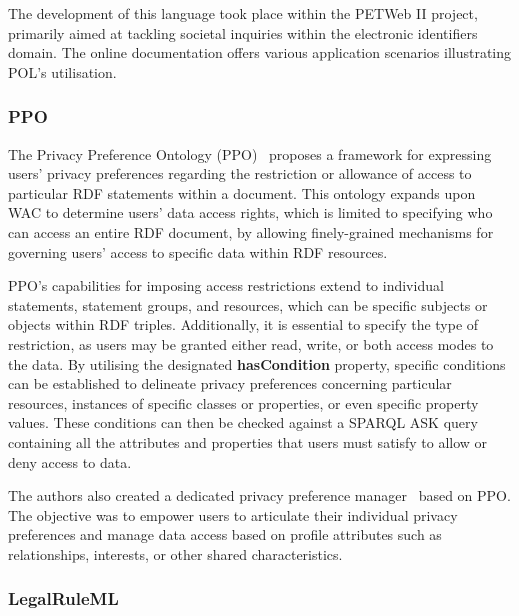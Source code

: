 The development of this language took place within the PETWeb II project, primarily aimed at tackling societal inquiries within the electronic identifiers domain.
The online documentation offers various application scenarios illustrating POL's utilisation.

\subsubsection{PPO}
\label{sec:ppo}

The Privacy Preference Ontology (PPO)~\citep{sacco_privacy_2011} proposes a framework for expressing users' privacy preferences regarding the restriction or allowance of access to particular RDF statements within a document.
This ontology expands upon WAC to determine users' data access rights, which is limited to specifying who can access an entire RDF document, by allowing finely-grained mechanisms for governing users' access to specific data within RDF resources.

PPO's capabilities for imposing access restrictions extend to individual statements, statement groups, and resources, which can be specific subjects or objects within RDF triples. 
Additionally, it is essential to specify the type of restriction, as users may be granted either read, write, or both access modes to the data.
By utilising the designated \textbf{hasCondition} property, specific conditions can be established to delineate privacy preferences concerning particular resources, instances of specific classes or properties, or even specific property values.
These conditions can then be checked against a SPARQL ASK query containing all the attributes and properties that users must satisfy to allow or deny access to data.

The authors also created a dedicated privacy preference manager~\citep{sacco_privacy_2011b} based on PPO.
The objective was to empower users to articulate their individual privacy preferences and manage data access based on profile attributes such as relationships, interests, or other shared characteristics.

\subsubsection{LegalRuleML}
\label{sec:legalruleml}

